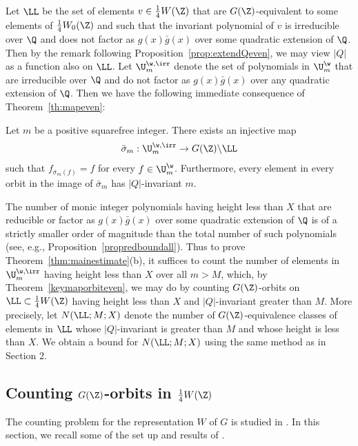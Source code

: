 Let $\LL$ be the set of elements $v\in \frac14W(\Z)$ that are $G(\Z)$-equivalent to some elements of $\frac14 W_0(\Z)$ and such that
the invariant polynomial of $v$ is irreducible
over $\Q$ and does not factor as $g(x)\bar{g}(x)$ over some quadratic extension of $\Q$.
Then by the remark following Proposition~\ref{prop:extendQeven}, we may view $|Q|$ as a function also on $\LL$.
Let $\U_m^{\w,\irr}$ denote the set of polynomials in $\U_m^\w$
that are irreducible
over $\Q$ and do not factor as $g(x)\bar{g}(x)$ over any quadratic extension of $\Q$. Then we have the following immediate consequence of Theorem~\ref{th:mapeven}:

\begin{theorem}
\notready\label{keymaporbiteven}
Let $m$ be a positive squarefree integer. There exists an injective map
$$\bar{\sigma}_m:\U_m^{\w,\irr}\to G(\Z)\backslash\LL$$ such that
$f_{\bar{\sigma}_m(f)}=f$ for every $f\in \U_m^\w$. Furthermore, every element
in every orbit in the image of $\bar{\sigma}_m$ has $|Q|$-invariant $m$.
\end{theorem}

The number of monic integer polynomials having height less than $X$ that are reducible or factor as $g(x)\bar{g}(x)$ over some quadratic extension of $\Q$ is of a strictly smaller order of magnitude than the total number of such polynomials (see, e.g., Proposition~\ref{propredboundall}). Thus to prove Theorem~\ref{thm:mainestimate}(b), it suffices to count the number of elements in
$\U_m^{\w,\irr}$ having height less than $X$ over all $m>M$, which, by Theorem~\ref{keymaporbiteven}, we may do by counting
$G(\Z)$-orbits on $\LL\subset \frac14W(\Z)$ having height less than $X$ and $|Q|$-invariant greater than $M$.
More precisely, let $N(\LL;M;X)$ denote the number of $G(\Z)$-equivalence classes of elements in
$\LL$ whose $|Q|$-invariant is greater than $M$ and whose height is
less than $X$. We obtain a bound for $N(\LL;M;X)$ using the same method as in Section 2.



\subsection{Counting $G(\Z)$-orbits in $\frac14W(\Z)$}\label{scoeffeven}

The counting problem for the representation $W$ of $G$ is studied in \cite{SW}. In this section, we recall some of the set up and results of \cite{SW}.

